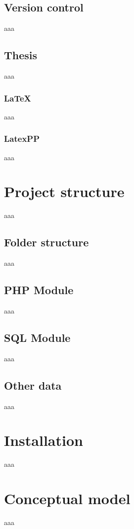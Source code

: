 \documentclass[12pt]{report}
\begin{document}
            \section{Version control}
                aaa

            \section{Thesis}
                aaa

                \subsection{\LaTeX}
                    aaa

                \subsection{LatexPP}
                    aaa

        \chapter{Project structure}
            aaa

            \section{Folder structure}
                aaa

            \section{PHP Module}
                aaa

            \section{SQL Module}
                aaa

            \section{Other data}
                aaa

        \chapter{Installation}
            aaa

        \chapter{Conceptual model}
            aaa
\end{document}
